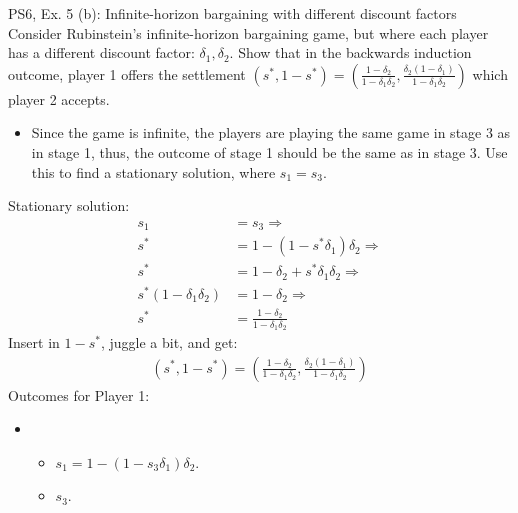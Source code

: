 \begin{frame}{PS6, Ex. 5 (b): Infinite-horizon bargaining with different discount factors}
    Consider Rubinstein's infinite-horizon bargaining game, but where each player has a different discount factor: $\delta_1,\delta_2$. Show that in the backwards induction outcome, player 1 offers the settlement
    $(s^{*},1-s^{*})=\left( \frac{1-\delta_2}{1-\delta_1\delta_2},\frac{\delta_2(1-\delta_1)}{1-\delta_1\delta_2}\right)$
    which player 2 accepts.
    \begin{itemize}
      \item[(Step b)] Since the game is infinite, the players are playing the same game in stage 3 as in stage 1, thus, the outcome of stage 1 should be the same as in stage 3. Use this to find a stationary solution, where $s_{1}=s_{3}$.
    \end{itemize}
  \begin{multicols}{2}
    Stationary solution:
    \begin{align*}
          s_1&= s_3 \Rightarrow\\
        s^{*}&= 1- (1-s^{*}\delta_1)\delta_2 \Rightarrow\\
        s^{*}&= 1-\delta_2+s^{*}\delta_1\delta_2 \Rightarrow\\
        s^{*}(1-\delta_1\delta_2)&= 1-\delta_2 \Rightarrow\\
        s^{*}&= \frac{1-\delta_2}{1-\delta_1\delta_2}
    \end{align*}
    Insert in $1-s^{*}$, juggle a bit, and get:
    \begin{align*}
        (s^{*},1-s^{*})= \left( \frac{1-\delta_2}{1-\delta_1\delta_2},\frac{\delta_2(1-\delta_1)}{1-\delta_1\delta_2}\right)
    \end{align*}
    \vfill\null \columnbreak
    Outcomes for Player 1:
    \begin{itemize}
        \item[]\vspace{-8pt}
            \begin{itemize}\normalsize
            \item[Stage 1:] $s_1 = 1-(1-s_3\delta_1)\delta_2$.
            \item[Stage 3:] $s_3$.
            \end{itemize}
    \end{itemize}
    \vfill\null
  \end{multicols}
    \vfill\null
\end{frame}




